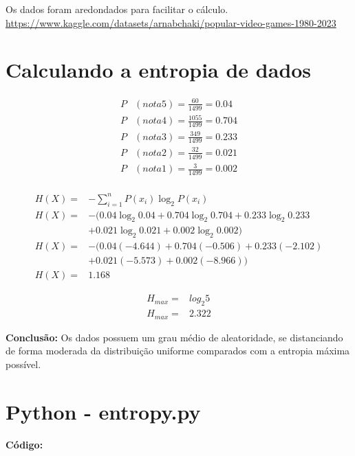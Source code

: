 \documentclass{article}
\begin{document}
\begin{center}
  Os dados foram aredondados para facilitar o cálculo.\\
  \href{https://www.kaggle.com/datasets/arnabchaki/popular-video-games-1980-2023}{https://www.kaggle.com/datasets/arnabchaki/popular-video-games-1980-2023}
\end{center}

\pagebreak

\section{Calculando a entropia de dados}

\begin{align*}
  P&(nota5)=\frac{60}{1499}=0.04\\
  P&(nota4)=\frac{1055}{1499}=0.704\\
  P&(nota3)=\frac{349}{1499}=0.233\\
  P&(nota2)=\frac{32}{1499}=0.021\\
  P&(nota1)=\frac{3}{1499}=0.002\\
\end{align*}

\begin{align*}
  H(X) =& -\sum_{i=1}^{n} P(x_i) \log_2 P(x_i)\\
  H(X) =&-(0.04 \log_2 0.04 + 0.704 \log_2 0.704 + 0.233 \log_2 0.233\\
        &+ 0.021 \log_2 0.021 + 0.002 \log_2 0.002)\\
  H(X) =&-(0.04 (-4.644) + 0.704 (-0.506) + 0.233 (-2.102)\\
        &+ 0.021 (-5.573) + 0.002 (-8.966))\\
  H(X) =&1.168
\end{align*}

\begin{align*}
  H_{max} =& log_2 5\\
  H_{max} =& 2.322
\end{align*}

\textbf{Conclusão:} Os dados possuem um grau médio de aleatoridade, se distanciando de forma moderada da distribuição uniforme comparados com a entropia máxima possível.

\pagebreak

\section{Python - entropy.py}

\textbf{\large Código:}
\end{document}
